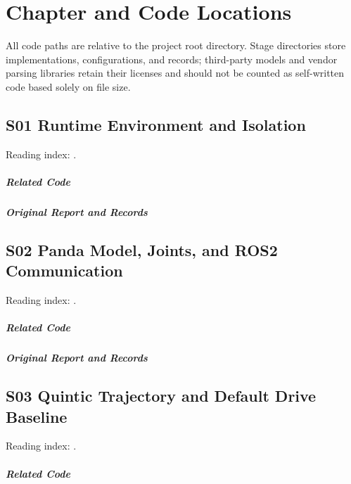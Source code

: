 \chapter{Chapter and Code Locations}
\label{app:code}
All code paths are relative to the project root directory. Stage directories store implementations, configurations, and records; third-party models and vendor parsing libraries retain their licenses and should not be counted as self-written code based solely on file size.
\section*{S01 Runtime Environment and Isolation}
\hypertarget{code-s01}{}
Reading index: .
\paragraph{Related Code}
\noindent{}\par
\paragraph{Original Report and Records}
\noindent{}\par
\section*{S02 Panda Model, Joints, and ROS2 Communication}
\hypertarget{code-s02}{}
Reading index: .
\paragraph{Related Code}
\noindent{}\par
\paragraph{Original Report and Records}
\noindent{}\par
\section*{S03 Quintic Trajectory and Default Drive Baseline}
\hypertarget{code-s03}{}
Reading index: .
\paragraph{Related Code}
\noindent{}\par
